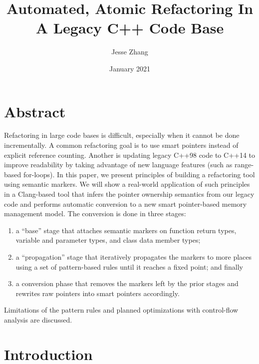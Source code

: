 \documentclass[sigplan,anonymous,review]{acmart}
\title{Automated, Atomic Refactoring In A Legacy C++ Code Base}
\author{Jesse Zhang}
\date{January 2021}
\begin{document}
\maketitle

\section{Abstract}
Refactoring in large code bases is difficult, especially when it cannot be done incrementally.
A common refactoring goal is to use smart pointers instead of explicit reference counting.
Another is updating legacy C++98 code to C++14 to improve readability by taking advantage of new language features (such as range-based for-loops).
In this paper, we present principles of building a refactoring tool using semantic markers.
We will show a real-world application of such principles in a Clang-based tool that infers the pointer ownership semantics from our legacy code and performs automatic conversion to a new smart pointer-based memory management model.
The conversion is done in three stages:
\begin{enumerate}
	\item a ``base'' stage that attaches semantic markers on function return types, variable and parameter types, and class data member types;
	\item a “propagation” stage that iteratively propagates the markers to more places using a set of pattern-based rules until it reaches a fixed point; and finally
	\item a conversion phase that removes the markers left by the prior stages and rewrites raw pointers into smart pointers accordingly.
\end{enumerate}
Limitations of the pattern rules and planned optimizations with control-flow analysis are discussed.

\section{Introduction}
\end{document}
